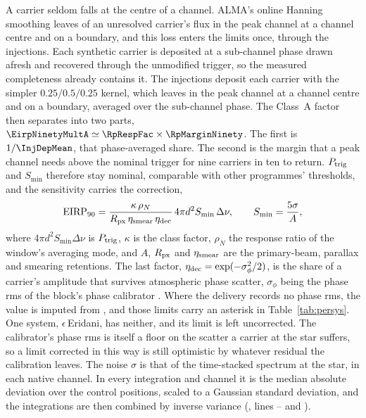 A carrier seldom falls at the centre of a channel. ALMA's online Hanning
smoothing \citep{ALMAHandbook} leaves \HanBest{} of an unresolved carrier's
flux in the peak channel at a channel centre and \HanWorst{} on a boundary,
and this loss enters the limits once, through the injections. Each synthetic
carrier is deposited at a sub-channel phase drawn afresh and recovered
through the unmodified trigger, so the measured completeness already
contains it. The injections deposit each carrier with the simpler
$0.25/0.5/0.25$ kernel, which leaves \InjDepCentre{} in the peak channel at a
channel centre and \InjDepEdge{} on a boundary, \InjDepMean{} averaged over
the sub-channel phase. The Class~A factor then separates into two parts,
$\EirpNinetyMultA\simeq\RpRespFac\times\RpMarginNinety$. The first is
$1/\InjDepMean$, that phase-averaged share. The second is the margin
that a peak channel needs above the nominal trigger for nine carriers in ten
to return. $P_{\rm trig}$ and $S_{\min}$ therefore stay nominal, comparable
with other programmes' thresholds, and the sensitivity carries the
correction,
\begin{equation}
\mathrm{EIRP}_{90}=\frac{\kappa\,\rho_N}{R_{\rm px}\,\eta_{\rm smear}\,\eta_{\rm dec}}\,
4\pi d^{2}S_{\min}\,\Delta\nu,\qquad S_{\min}=\frac{5\sigma}{A},
\label{eq:eirp90}
\end{equation}
where $4\pi d^{2}S_{\min}\Delta\nu$ is $P_{\rm trig}$, $\kappa$ is the class
factor, $\rho_N$ the response ratio of the window's averaging mode, and $A$, $R_{\rm px}$ and $\eta_{\rm smear}$ are the
primary-beam, parallax and smearing retentions. The last factor,
$\eta_{\rm dec}=\exp(-\sigma_\phi^{2}/2)$, is the share of a carrier's
amplitude that survives atmospheric phase scatter, $\sigma_\phi$ being the
phase rms of the block's phase calibrator \citep[Eq.~3]{Richards2022}.
Where the delivery records no phase rms, the value is imputed from
\DcImputedRule, and those limits carry an asterisk in
Table~\ref{tab:persys}. One system, $\epsilon$\,Eridani, has neither, and its
limit is left uncorrected.
The calibrator's phase rms is itself a floor on the scatter a carrier at
the star suffers, so a limit corrected in this way is still optimistic by
whatever residual the calibration leaves. The noise $\sigma$ is that of the
time-stacked spectrum at the star, in each native channel. In every
integration and channel it is the median absolute deviation over the control
positions, scaled to a Gaussian standard deviation, and the integrations are
then combined by inverse variance (\texttt{\LrSigFile}, lines
\LrSigLineMad--\LrSigLineSig{} and \LrSigLineComb).

